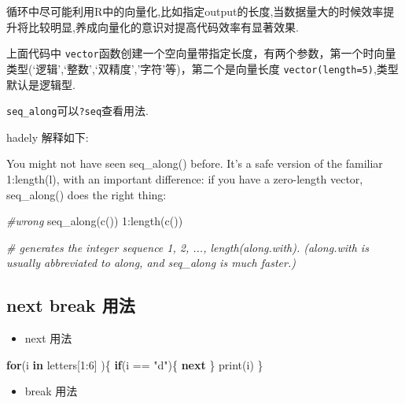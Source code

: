 \documentclass[
]{book}
\newenvironment{Shaded}{\begin{snugshade}}{\end{snugshade}}
\newcommand{\CommentTok}[1]{\textcolor[rgb]{0.56,0.35,0.01}{\textit{#1}}}
\newcommand{\ControlFlowTok}[1]{\textcolor[rgb]{0.13,0.29,0.53}{\textbf{#1}}}
\newcommand{\DecValTok}[1]{\textcolor[rgb]{0.00,0.00,0.81}{#1}}
\newcommand{\FunctionTok}[1]{\textcolor[rgb]{0.00,0.00,0.00}{#1}}
\newcommand{\NormalTok}[1]{#1}
\newcommand{\SpecialCharTok}[1]{\textcolor[rgb]{0.00,0.00,0.00}{#1}}
\newcommand{\StringTok}[1]{\textcolor[rgb]{0.31,0.60,0.02}{#1}}
\providecommand{\tightlist}{%
  \setlength{\itemsep}{0pt}\setlength{\parskip}{0pt}}
\begin{document}
循环中尽可能利用R中的向量化,比如指定output的长度,当数据量大的时候效率提升将比较明显,养成向量化的意识对提高代码效率有显著效果.

上面代码中 \texttt{vector}函数创建一个空向量带指定长度，有两个参数，第一个时向量类型(`逻辑',`整数',`双精度','字符'等)，第二个是向量长度 \texttt{vector(length=5)},类型默认是逻辑型.

\texttt{seq\_along}可以\texttt{?seq}查看用法.

hadely 解释如下:

You might not have seen seq\_along() before. It's a safe version of the familiar 1:length(l), with an important difference: if you have a zero-length vector, seq\_along() does the right thing:

\begin{Shaded}
\begin{Highlighting}[]
\CommentTok{\#wrong}
\FunctionTok{seq\_along}\NormalTok{(}\FunctionTok{c}\NormalTok{())}
\DecValTok{1}\SpecialCharTok{:}\FunctionTok{length}\NormalTok{(}\FunctionTok{c}\NormalTok{())}

\CommentTok{\# generates the integer sequence 1, 2, ..., length(along.with). (along.with is usually abbreviated to along, and  seq\_along is much faster.)}
\end{Highlighting}
\end{Shaded}

\hypertarget{next-break-ux7528ux6cd5}{%
\subsection{next break 用法}\label{next-break-ux7528ux6cd5}}

\begin{itemize}
\tightlist
\item
  next 用法
\end{itemize}

\begin{Shaded}
\begin{Highlighting}[]
\ControlFlowTok{for}\NormalTok{(i }\ControlFlowTok{in}\NormalTok{ letters[}\DecValTok{1}\SpecialCharTok{:}\DecValTok{6}\NormalTok{] )\{}
  \ControlFlowTok{if}\NormalTok{(i }\SpecialCharTok{==} \StringTok{"d"}\NormalTok{)\{}
  \ControlFlowTok{next}
\NormalTok{  \}}
  \FunctionTok{print}\NormalTok{(i)}
\NormalTok{\}}
\end{Highlighting}
\end{Shaded}

\begin{itemize}
\tightlist
\item
  break 用法
\end{itemize}
\end{document}
